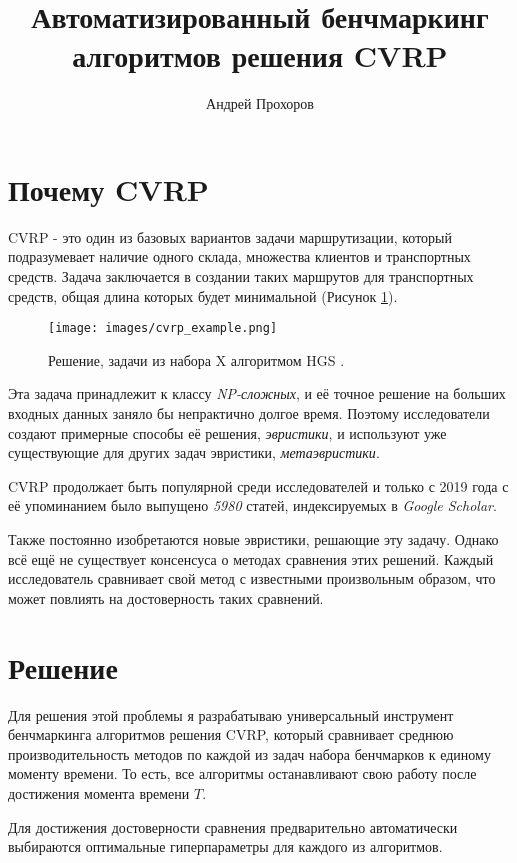 \documentclass[a4paper,12pt]{article}
\title{Автоматизированный бенчмаркинг алгоритмов решения CVRP}
\author{Андрей Прохоров}
\date{\vspace{-5ex}}
\begin{document}
\maketitle

\section*{Почему CVRP}

CVRP - это один из базовых вариантов задачи
маршрутизации, который подразумевает наличие
одного склада, множества клиентов и транспортных
средств. Задача заключается в создании таких
маршрутов для транспортных средств, общая длина
которых будет минимальной (Рисунок \ref{cvrp_example}).

\begin{figure}[h]
    \centering
    \texttt{[image: images/cvrp\_example.png]}
    \caption{
        Решение, задачи из
        набора X \autocite{uchoaNewBenchmarkInstances2017}
        алгоритмом HGS \autocite{vidalHybridGeneticSearch2022}.
        \label{cvrp_example} 
    }
\end{figure}

Эта задача принадлежит к классу \emph{NP-сложных}, и
её точное решение на больших входных данных заняло бы 
непрактично долгое время. Поэтому исследователи создают
примерные способы её решения, \emph{эвристики}, и 
используют уже существующие для других задач эвристики, 
\emph{метаэвристики}.

CVRP продолжает быть популярной среди исследователей и
только с 2019 года с её упоминанием было выпущено 
\emph{5980} статей, индексируемых в \emph{Google Scholar}.

Также постоянно изобретаются новые эвристики, решающие
эту задачу. Однако всё ещё не существует
консенсуса о методах сравнения этих решений. Каждый
исследователь сравнивает свой метод с известными
произвольным образом, что может повлиять на достоверность
таких сравнений.

\section*{Решение}
Для решения этой проблемы я разрабатываю универсальный
инструмент бенчмаркинга алгоритмов решения CVRP, который
сравнивает среднюю производительность методов по каждой
из задач набора бенчмарков к единому моменту времени.
То есть, все алгоритмы останавливают свою работу после
достижения момента времени $T$.

Для достижения достоверности сравнения предварительно
автоматически выбираются оптимальные гиперпараметры для
каждого из алгоритмов.
\end{document}
